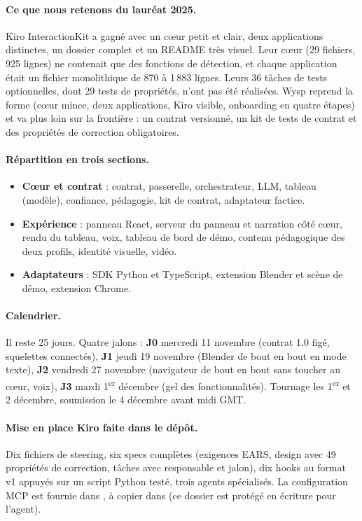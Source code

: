 \paragraph{Ce que nous retenons du lauréat 2025.} Kiro InteractionKit a gagné avec un cœur petit et clair, deux applications distinctes, un dossier  complet et un README très visuel. Leur cœur (29 fichiers, 925 lignes) ne contenait que des fonctions de détection, et chaque application était un fichier monolithique de 870 à 1\,883 lignes. Leurs 36 tâches de tests optionnelles, dont 29 tests de propriétés, n'ont pas été réalisées. Wysp reprend la forme (cœur mince, deux applications, Kiro visible, onboarding en quatre étapes) et va plus loin sur la frontière : un contrat versionné, un kit de tests de contrat et des propriétés de correction obligatoires.

\paragraph{Répartition en trois sections.}
\begin{itemize}[leftmargin=1.2em]
  \item \PA{} \textbf{Cœur et contrat} : contrat, passerelle, orchestrateur, LLM, tableau (modèle), confiance, pédagogie, kit de contrat, adaptateur factice.
  \item \PB{} \textbf{Expérience} : panneau React, serveur du panneau et narration côté cœur, rendu du tableau, voix, tableau de bord de démo, contenu pédagogique des deux profils, identité visuelle, vidéo.
  \item \PC{} \textbf{Adaptateurs} : SDK Python et TypeScript, extension Blender et scène de démo, extension Chrome.
\end{itemize}

\paragraph{Calendrier.} Il reste 25 jours. Quatre jalons : \textbf{J0} mercredi 11 novembre (contrat 1.0 figé, squelettes connectés), \textbf{J1} jeudi 19 novembre (Blender de bout en bout en mode texte), \textbf{J2} vendredi 27 novembre (navigateur de bout en bout sans toucher au cœur, voix), \textbf{J3} mardi 1\textsuperscript{er} décembre (gel des fonctionnalités). Tournage les 1\textsuperscript{er} et 2 décembre, soumission le 4 décembre avant midi GMT.

\paragraph{Mise en place Kiro faite dans le dépôt.} Dix fichiers de steering, six specs complètes (exigences EARS, design avec 49 propriétés de correction, tâches avec responsable et jalon), dix hooks au format v1 appuyés sur un script Python testé, trois agents spécialisés. La configuration MCP est fournie dans , à copier dans  (ce dossier est protégé en écriture pour l'agent).

